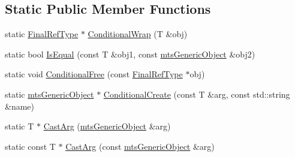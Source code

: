 \subsection*{Static Public Member Functions}
\begin{DoxyCompactItemize}
\item 
static \hyperlink{classmts_generic_types_a7c2afd28b04e256ba9e64661009c078e}{Final\-Ref\-Type} $\ast$ \hyperlink{classmts_generic_types_aca04b62b7381a144de23b67366fa938f}{Conditional\-Wrap} (T \&obj)
\item 
static bool \hyperlink{classmts_generic_types_a4dfe13c2f84856ed126d9987ad0bdf5c}{Is\-Equal} (const T \&obj1, const \hyperlink{classmts_generic_object}{mts\-Generic\-Object} \&obj2)
\item 
static void \hyperlink{classmts_generic_types_a82cef8739e4677ec03d45fc10b560a26}{Conditional\-Free} (const \hyperlink{classmts_generic_types_a7c2afd28b04e256ba9e64661009c078e}{Final\-Ref\-Type} $\ast$obj)
\item 
static \hyperlink{classmts_generic_object}{mts\-Generic\-Object} $\ast$ \hyperlink{classmts_generic_types_aa0a8f700332a2aaf61cfc357e3e2f3c0}{Conditional\-Create} (const T \&arg, const std\-::string \&name)
\item 
static T $\ast$ \hyperlink{classmts_generic_types_afc715c230cae008992cd0faac2a93be4}{Cast\-Arg} (\hyperlink{classmts_generic_object}{mts\-Generic\-Object} \&arg)
\item 
static const T $\ast$ \hyperlink{classmts_generic_types_aa8a3330bdd62b3a417893b238e10f32f}{Cast\-Arg} (const \hyperlink{classmts_generic_object}{mts\-Generic\-Object} \&arg)
\end{DoxyCompactItemize}


